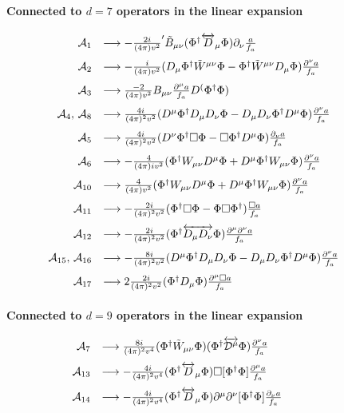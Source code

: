 \documentclass[11pt]{article}
\newcommand{\m}{\mu}
\newcommand{\f}{\Phi}
\renewcommand{\m}{\mu}
\newcommand{\n}{\nu}
\newcommand{\A}{\mathcal{A}}
\newcommand{\D}{\mathcal{D}}
\newcommand{\fda}{\f^\dagger}
\newcommand{\BBd}{B_{\mu\nu}}
\newcommand{\Wt}{{\tilde{W}}}
\newcommand{\de}{\partial}
\newcommand{\olra}{\overleftrightarrow}
\renewcommand{\[}{\begin{equation}}
\renewcommand{\]}{\end{equation}}
\begin{document}
\begin{appendices}
\[\begin{array}{rl}
\end{array}
\]

\paragraph{Connected to $d=7$ operators in the linear expansion}

\[
\hspace{-0.85cm}\begin{array}{rl}
\A_1 &\longrightarrow  -\frac{2i}{(4\pi) v^2}^\prime\tilde{B}_{\m\n}(\f^\dagger\overleftrightarrow{D}_\m \f) \de_\n\frac{ a}{f_a} \\[3mm]
\A_2 &\longrightarrow  -\frac{i}{(4\pi) v^2}(D_\m \fda \Wt^{\m\n}\f-\fda \Wt^{\m\n}D_\m \f)\frac{\de^\nu a}{f_a} \\[3mm]
\A_3 &\longrightarrow \frac{-2}{(4\pi) v^2}\BBd \frac{\de^\m a}{f_a} D^(\fda\f) \\[3mm]
\A_4,\,\A_8 &\longrightarrow \frac{4i}{(4\pi)^2v^2} (D^\m \fda D_\m D_\n \f - D_\m D_\n \fda D^\m \f) \frac{\de^\n a}{f_a} \\[3mm]
\A_5 &\longrightarrow \frac{4i}{(4\pi)^2v^2} (D^\n \fda \Box \f - \Box \fda D^\m \f) \frac{\de_\n a}{f_a} \\[3mm]
\A_6 &\longrightarrow -\frac{4}{(4\pi)i v^2} (\fda W_{\m\n} D^\m \f + D^\m \fda W_{\m\n}\f)\frac{\de^\n a}{f_a} \\[3mm]
\A_{10} &\longrightarrow \frac{4}{(4\pi) v^2} (\fda W_{\m\n} D^\m \f + D^\m \fda W_{\m\n}\f)\frac{\de^\n a}{f_a} \\[3mm]
\A_{11} &\longrightarrow -\frac{2i}{(4\pi)^2 v^2} (\fda \Box \f-\f \Box \fda)\frac{\Box a}{f_a} \\[3mm]
\A_{12} &\longrightarrow -\frac{2i}{(4\pi)^2 v^2} (\fda \olra{D_\m D_\n}\f) \frac{\de^\m \de^\n a}{f_a} \\[3mm]
\A_{15},\,\A_{16} &\longrightarrow -\frac{8i}{(4\pi)^2 v^2} (D^\mu \fda D_\m D_\n \f - D_\m D_\n \fda D^\m \f) \frac{\de^\n a}{f_a} \\[3mm]
\A_{17}&\longrightarrow 2\frac{2i}{(4\pi)^2 v^2} (\fda D_\m \f) \frac{\de^\m \Box a}{f_a}
\end{array}
\]

\paragraph{Connected to $d=9$ operators in the linear expansion}
\[
\hspace{-1.9cm}\begin{array}{rl}
\A_7 &\longrightarrow \frac{8i}{(4\pi)^2 v^4}(\fda \Wt_{\m\n}\f)(\fda \olra{\D^\m} \f)\frac{\de^\n a}{f_a} \\[3mm]
\A_{13} &\longrightarrow -\frac{4i}{(4\pi)^2v^4} (\fda \olra{D}_\m \f ) \Box[\fda \f ]\frac{\de^\m a}{f_a} \\[3mm]
\A_{14} &\longrightarrow-\frac{4i}{(4\pi)^2v^4} (\fda \olra{D}_\m \f ) \de^\m\de^\n[\fda \f ]\frac{\de_\n a}{f_a} \\[3mm]


\end{array}\]
\end{appendices}
\end{document}
